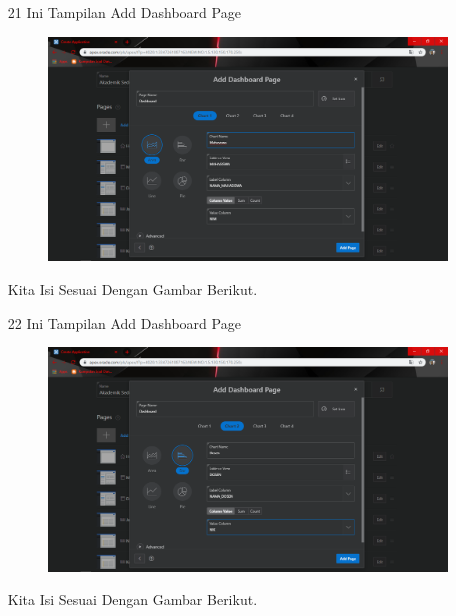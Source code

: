 \begin{enumerate}
\newpage
\item[21]Ini Tampilan Add Dashboard Page

\begin{figure}[!htbp]
    \begin{center}
    \includegraphics[scale=0.3]{figures/32.png}
    \end{center}   
    \end{figure}
    
\par
Kita Isi Sesuai Dengan Gambar Berikut.

\item[22]Ini Tampilan Add Dashboard Page

\begin{figure}[!htbp]
    \begin{center}
    \includegraphics[scale=0.3]{figures/33.png}
    \end{center}   
    \end{figure}
    
\par
Kita Isi Sesuai Dengan Gambar Berikut.


\end{enumerate}
